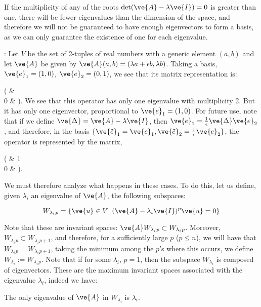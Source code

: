 If the multiplicity of any of the roots $\det(\ve{A}-\lambda\ve{I})=0$ is 
greater than one, there will be fewer eigenvalues than the dimension of the space, and therefore we will not be guaranteed to have enough eigenvectors to form a basis, as we can only guarantee the existence of one for each eigenvalue.

\ejem: Let $V$ be the set of 2-tuples of real numbers with a generic element
$(a,b)$ and let $\ve{A}$ be given by $\ve{A}(a,b) = (\lambda a+\epsilon b,\lambda b)$. Taking a basis, 
$\ve{e}_1=(1,0)$, 
$\ve{e}_2=(0,1)$, we see that its matrix representation is:

\beq\left(
     \lambda & \epsilon    \\
     0 &  \lambda
     \earr\right).
\eeq
%
We see that this operator has only one eigenvalue with multiplicity 2. But it has only one eigenvector, proportional to $\ve{e}_1=(1,0)$. For future use, note that if we define 
$\ve{\Delta} = \ve{A}-\lambda \ve{I}$, then $\ve{e}_{1} = \frac{1}{\epsilon}\ve{\Delta}\ve{e}_2$,
and therefore, in the basis $\{\ve{\tilde{e}}_{1} = \ve{e}_{1}, \ve{\tilde{e}}_{2} = \frac{1}{\epsilon}\ve{e}_{2}\}$,
the operator is represented by the matrix,

\beq\left(
     \lambda & 1    \\
     0 &  \lambda
     \earr\right).
\eeq

\espa

We must therefore analyze what happens in these cases. 
To do this, let us define, 
given $\lambda_i$ an eigenvalue of $\ve{A}$, the 
following subspaces:

\begin{equation}
  \label{eq:W_lm}
  W_{\lambda_i}{}_p = \{ \ve{u} \in V | \; (\ve{A} - \lambda_i \ve{I})^p \ve{u} = 0 \}
\end{equation}

Note that these are invariant spaces: 
$\ve{A} W_{\lambda_i}{}_p \subset W_{\lambda_i}{}_p$.
Moreover, $W_{\lambda_i}{}_p \subset W_{\lambda_i}{}_{p+1}$, and therefore, for a sufficiently large $p$ ($p \leq n$), we will have that 
$W_{\lambda_i}{}_p = W_{\lambda_i}{}_{p+1}$, taking the minimum among the
$p$'s where this occurs, we define $W_{\lambda_i} := W_{\lambda_i}{}_p$.
Note that if for some $\lambda_i$, $p=1$, then the subspace $W_{\lambda_i}$
is composed of eigenvectors.
These are the maximum invariant spaces associated with the eigenvalue $\lambda_i$,
indeed we have:

\blem
The only eigenvalue of $\ve{A}$ in $W_{\lambda_i}$ is $\lambda_i$.
\elem

